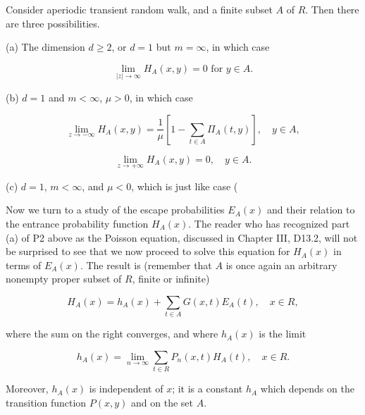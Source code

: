 Consider aperiodic transient random walk, and a finite subset $A$ of $R$. Then there are three possibilities.

(a) The dimension $d \geq 2$, or $d = 1$ but $m = \infty$, in which case

$$\lim_{|z| \to \infty} H_A(x,y) = 0 \text{ for } y \in A.$$

(b) $d = 1$ and $m < \infty$, $\mu > 0$, in which case

$$\lim_{z \to -\infty} H_A(x,y) = \frac{1}{\mu} \left[ 1 - \sum_{t \in A} \Pi_A(t,y) \right], \quad y \in A,$$

$$\lim_{z \to +\infty} H_A(x,y) = 0, \quad y \in A.$$

(c) $d = 1$, $m < \infty$, and $\mu < 0$, which is just like case (

Now we turn to a study of the escape probabilities $E_A(x)$ and their relation to the entrance probability function $H_A(x)$. The reader who has recognized part (a) of P2 above as the Poisson equation, discussed in Chapter III, D13.2, will not be surprised to see that we now proceed to solve this equation for $H_A(x)$ in terms of $E_A(x)$. The result is (remember that $A$ is once again an arbitrary nonempty proper subset of $R$, finite or infinite)

$$H_A(x) = h_A(x) + \sum_{t \in A} G(x,t)E_A(t), \quad x \in R,$$

where the sum on the right converges, and where $h_A(x)$ is the limit

$$h_A(x) = \lim_{n \to \infty} \sum_{t \in R} P_n(x,t)H_A(t), \quad x \in R.$$

Moreover, $h_A(x)$ is independent of $x$; it is a constant $h_A$ which depends on the transition function $P(x,y)$ and on the set $A$.
